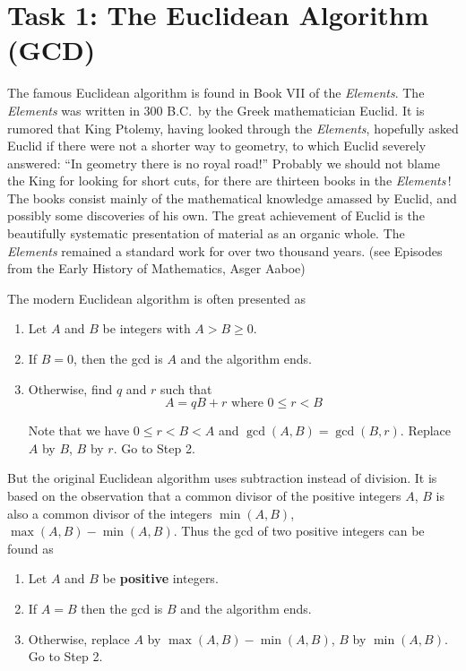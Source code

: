 \pagestyle{plain}

\setlength{\textwidth}{16 cm}
\setlength{\textheight}{26.0 cm}
\setlength{\topmargin}{0pt}
\setlength{\headsep}{0pt}
\setlength{\headheight}{0pt}
\renewcommand{\baselinestretch}{1.0}
\setlength{\parskip}{\medskipamount}

\hoffset=-1.8cm
\voffset=-0.8cm



\section*{Task 1: The Euclidean Algorithm (GCD)}
\setcounter{section}{1}
\setcounter{subsection}{0}

The famous Euclidean algorithm is found in Book VII of the {\em Elements}.
The {\em Elements} was written in 300 B.C.~by the Greek mathematician
Euclid.
It is rumored that 
King Ptolemy,
having looked through the {\em Elements},
hopefully asked Euclid if there were not a shorter way to geometry,
to which Euclid severely answered:
``In geometry there is no royal road!''
Probably we should not blame the King for looking for short cuts,
for there are thirteen books in the {\em Elements}\,!
The books consist mainly of the mathematical knowledge amassed by Euclid,
and possibly some discoveries of his own.
The great achievement of Euclid is the beautifully systematic presentation
of material as an organic whole.
The {\em Elements} remained a standard work for over two thousand years.
(see Episodes from the Early History of Mathematics, Asger Aaboe)

The modern Euclidean algorithm
is often presented as
\begin{enumerate}
\item	Let $A$ and $B$ be integers with $A > B \geq 0$.

\item	If $B = 0$,
	then the gcd is $A$ and the algorithm ends.

\item	Otherwise,
	find $q$ and $r$ such that
\[
A = q B + r	\mbox{\ where\ } 0 \leq r < B
\]

	Note that we have $0 \leq r < B < A$
	and $\gcd(A,B) = \gcd(B,r)$.
	Replace $A$ by $B$,
	$B$ by $r$.
	Go to Step 2.
\end{enumerate}
But the original Euclidean algorithm uses
subtraction instead of division.
It is based on the observation that
a common divisor of the positive integers $A$, $B$ is also a common
divisor of the integers $\min(A,B)$, $\max(A,B)-\min(A,B)$.
Thus the gcd of two positive integers can be found as
\begin{enumerate}
\item	Let $A$ and $B$ be {\bf positive} integers.

\item	If $A = B$ then the gcd is $B$ and the algorithm ends.

\item	Otherwise,
	replace $A$ by $\max(A,B)-\min(A,B)$,
	$B$ by $\min(A,B)$.
	Go to Step 2.
\end{enumerate}

